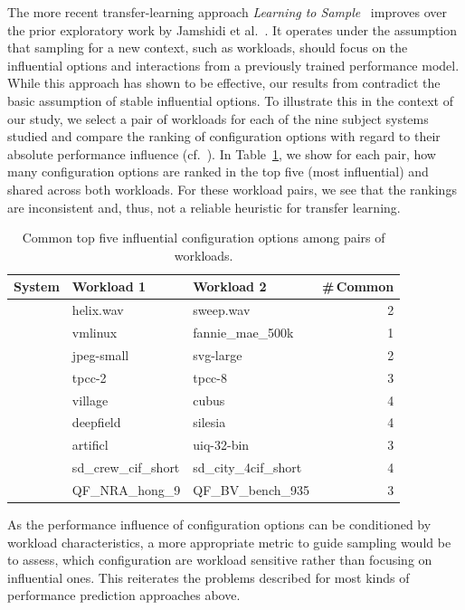 {{{The more recent transfer-learning approach \emph{Learning to Sample}~\cite{jamshidi_learning_2018} improves over the prior exploratory work by Jamshidi et al.~\cite{jamishidi_transfer_2017}. It operates under the assumption that sampling for a new context, such as workloads, should focus on the influential options and interactions from a previously trained performance model. While this approach has shown to be effective, our results from  contradict the basic assumption of stable influential options. 
To illustrate this in the context of our study, we select a pair of workloads for each of the nine subject systems studied and compare the ranking of configuration options with regard to their absolute performance influence (cf.~). In Table~\ref{tab:shared_options}, we show for each pair, how many configuration options are ranked in the top five (most influential) and shared across both workloads. For these workload pairs, we see that the rankings are inconsistent and, thus, not a reliable heuristic for transfer learning.
\begin{table}
	\centering
	\footnotesize
	\caption{Common top five influential configuration options among pairs of workloads.}
	\begin{tabular}{p{12mm}llr}
		\toprule
		\textbf{System} & \textbf{Workload 1} & \textbf{Workload 2} & \textbf{\#\,Common} \\
		\midrule
		\jumper & helix.wav & sweep.wav & 2\\
		\kanzi & vmlinux & fannie\_mae\_500k & 1\\
		\dconvert & jpeg-small & svg-large & 2\\
		\htwo & tpcc-2 & tpcc-8 & 3\\
		\batik & village & cubus & 4\\
		\midrule
		\xz & deepfield & silesia & 4\\
		\lrzip & artificl & uiq-32-bin & 3\\
		\xzwo & sd\_crew\_cif\_short &sd\_city\_4cif\_short & 4\\
		\zdrei & QF\_NRA\_hong\_9 & QF\_BV\_bench\_935 & 3\\
		\bottomrule
	\end{tabular}
\label{tab:shared_options}
\end{table}


As the performance influence of configuration options can be conditioned by workload characteristics, a more appropriate metric to guide sampling would be to assess, which configuration are workload sensitive rather than focusing on influential ones. This reiterates the problems described for most kinds of performance prediction approaches above.

}}}
